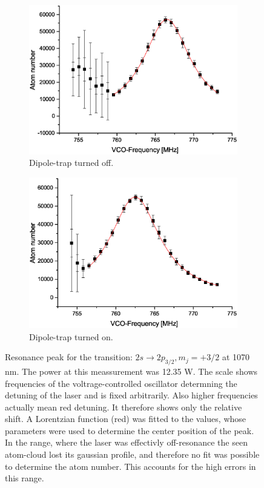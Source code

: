\begin{figure}[h]
\centering
\begin{subfigure}[b]{0.48\textwidth}
                \includegraphics[width=\textwidth]{withoutodt}
                \caption{Dipole-trap turned off.}
\end{subfigure}
\begin{subfigure}[b]{0.48\textwidth}
               \includegraphics[width=\textwidth]{withodt}
                \caption{Dipole-trap turned on.}
\end{subfigure}


\caption{Resonance peak for the transition: $2s\rightarrow2p_{3/2}, m_j=+3/2$ at 1070 nm. The power at this meassurement was 12.35 W. The scale shows frequencies of the voltrage-controlled oscillator determning the detuning of the laser and is fixed arbitrarily. Also higher frequencies actually mean red detuning. It therefore shows only the relative shift. A Lorentzian function (red) was fitted to the values, whose parameters were used to determine the center position of the peak. In the range, where the laser was effectivly off-resonance the seen atom-cloud lost its gaussian profile, and therefore no fit was possible to determine the atom number. This accounts for the high errors in this range.}
\label{resonance}
\end{figure}	
